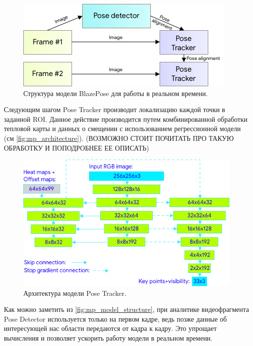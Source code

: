 \begin{figure}[h]
	\centering
	\includegraphics[width=\textwidth * 4 / 5]{./images/MPPose/Model_structure.jpg}
	\caption{Структура модели BlazePose для работы в реальном времени. \cite{BlazePose}}
	\label{fig:mp_model_structure}
\end{figure}

Следующим шагом Pose Tracker производит локализацию каждой точки в заданной ROI. Данное действие производится путем комбинированной обработки тепловой карты и данных о смещении с использованием регрессионной модели (см \autoref{fig:mp_architecture}). (ВОЗМОЖНО СТОИТ ПОЧИТАТЬ ПРО ТАКУЮ ОБРАБОТКУ И ПОПОДРОБНЕЕ ЕЕ ОПИСАТЬ)

\begin{figure}[h]
	\centering
	\includegraphics[width=\textwidth * 4 / 5]{./images/MPPose/architecture.jpg}
	\caption{Архитектура модели Pose Tracker. \cite{BlazePose}}
	\label{fig:mp_architecture}
\end{figure}

Как можно заметить из \autoref{fig:mp_model_structure}, при аналитике видеофрагмента Pose Detector используется только на первом кадре, ведь позже данные об интересующей нас области передаются от кадра к кадру. Это упрощает вычисления и позволяет ускорить работу модели в реальном времени.

